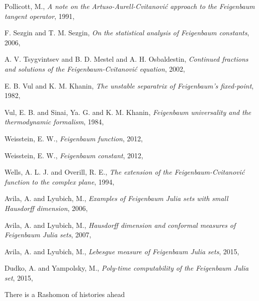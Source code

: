 \begin{description}
{Pollicott, M.},
{\em A note on the {Artuso-Aurell-Cvitanovi{\'c}} approach to the {Feigenbaum} tangent operator},
{1991},

{F. Sezgin and T. M. Sezgin},
{\em On the statistical analysis of {Feigenbaum} constants},
{2006},

{A. V. Tsygvintsev and B. D. Mestel and A. H. Osbaldestin},
{\em Continued fractions and solutions of the {Feigenbaum-Cvitanovi{\'{c}}} equation},
{2002},

{E. B. Vul and K. M. Khanin},
{\em The unstable separatrix of {Feigenbaum}'s fixed-point},
{1982},

{Vul, E. B. and Sinai, Ya. G. and K. M. Khanin},
{\em Feigenbaum universality and the thermodynamic formalism},
{1984},

{Weisstein, E. W.},
{\em Feigenbaum function},
{2012},

{Weisstein, E. W.},
{\em Feigenbaum constant},
{2012},

{Wells, A. L. J. and Overill, R. E.},
{\em The extension of the {Feigenbaum-Cvitanovi{\'c}} function to the complex plane},
{1994},

{Avila, A. and Lyubich, M.},
  {\em Examples of {Feigenbaum Julia} sets with small {Hausdorff} dimension},
{2006},

{Avila, A. and Lyubich, M.},
  {\em Hausdorff dimension and conformal measures of {Feigenbaum Julia} sets},
{2007},

{Avila, A. and Lyubich, M.},
{\em Lebesgue measure of Feigenbaum Julia sets},
{2015},

{Dudko, A. and Yampolsky, M.},
  {\em Poly-time computability of the {Feigenbaum Julia} set},
{2015},




\end{description}


There is a Rashomon of histories ahead

